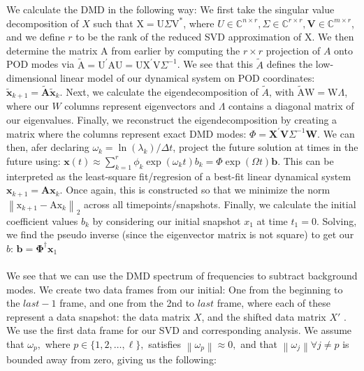\documentclass{article}
\begin{document}
We calculate the DMD in the following way: We first take the singular value decomposition of $X$ such that $\mathrm{X}=\mathrm{U} \Sigma \mathrm{V}^{*}$, where $U \in \mathbb{C}^{n \times r}, \Sigma \in \mathbb{C}^{r \times r}, \mathbf{V} \in \mathbb{C}^{m \times r}$, and we define $r$ to be the rank of the reduced SVD approximation of X. We then determine the matrix A from earlier  by computing the $r\times r$ projection of $A$ onto POD modes via $\tilde{\mathrm{A}}=\mathrm{U}^{\prime} \mathrm{AU}=\mathrm{U} \mathrm{X}^{\prime} \mathrm{V} \Sigma^{-1}$. We see that this $\tilde{A}$ defines the low-dimensional linear model of our dynamical system on POD coordinates: $\tilde{\mathbf{x}}_{k+1}=\tilde{\mathbf{A}} \tilde{\mathbf{x}}_{k}$. Next, we calculate the eigendecomposition of $\tilde{A}$, with $\tilde{\mathrm{A}} \mathrm{W}=\mathrm{W} \Lambda$, where our $W$ columns represent eigenvectors and $\Lambda$ contains a diagonal matrix of our eigenvalues. Finally, we reconstruct the eigendecomposition by creating a matrix where the columns represent exact DMD modes: $\Phi=\mathbf{X}^{\prime} \mathbf{V} \Sigma^{-1} \mathbf{W}$. We can then, afer declaring  $\omega_{k}=\ln \left(\lambda_{k}\right) / \Delta t$, project the future solution at times in the future using: $\mathbf{x}(t) \approx \sum_{k=1}^{r} \phi_{k} \exp \left(\omega_{k} t\right) b_{k}=\Phi \exp (\Omega t) \mathbf{b}$. This can be interpreted as the least-square fit/regresion of a best-fit linear dynamical system $\mathbf{x}_{k+1}=\mathbf{A} \mathbf{x}_{k}$. Once again, this is constructed so that we minimize the norm $\left\|\mathrm{x}_{k+1}-\mathrm{Ax}_{k}\right\|_{2}$ across all timepoints/snapshots. Finally, we calculate the initial coefficient values $b_k$ by considering our initial snapshot $x_1$ at time $t_1 = 0$. Solving, we find the pseudo inverse (since the eigenvector matrix is not square) to get our $b$:  $\mathbf{b}=\mathbf{\Phi}^{\dagger} \mathbf{x}_{1}$\\ \\
We see that we can use the DMD spectrum of frequencies to subtract background modes. We create two data frames from our initial: One from the beginning to the $last-1$ frame, and one from the 2nd to $last$ frame, where each of these represent a data snapshot: the data matrix $X$, and the shifted data matrix $X'$ . We use the first data frame for our SVD and corresponding analysis. We assume that $\omega_{p},$ where $p \in\{1,2, \ldots, \ell\},$ satisfies $\left\|\omega_{p}\right\| \approx 0,$ and that $\left\|\omega_{j}\right\| \forall j \neq p$ is bounded away from zero, giving us the following: 
\end{document}
